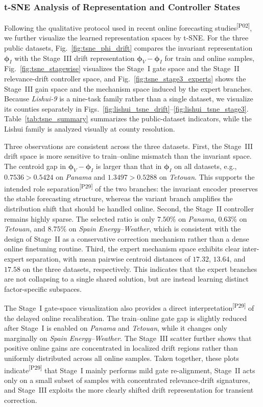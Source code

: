 ﻿\documentclass[journal]{IEEEtran}
\DeclareRobustCommand{\auditbad}[2]{{\color{auditred}#1}{\color{auditred}\textsuperscript{[#2]}}}
\begin{document}
\subsubsection{t-SNE Analysis of Representation and Controller States}
\auditbad{Following the qualitative protocol used in recent online forecasting studies}{P02}, we further visualize the learned representation spaces by t-SNE. For the three public datasets, Fig.~\ref{fig:tsne_phi_drift} compares the invariant representation $\boldsymbol{\phi}_{I}$ with the Stage~III drift representation $\boldsymbol{\phi}_{V}-\boldsymbol{\phi}_{I}$ for train and online samples, Fig.~\ref{fig:tsne_stagewise} visualizes the Stage~I gate space and the Stage~II relevance-drift controller space, and Fig.~\ref{fig:tsne_stage3_experts} shows the Stage~III gain space and the mechanism space induced by the expert branches. Because \textit{Lishui-9} is a nine-task family rather than a single dataset, we visualize its counties separately in Figs.~\ref{fig:lishui_tsne_drift}--\ref{fig:lishui_tsne_stage3}. Table~\ref{tab:tsne_summary} summarizes the public-dataset indicators, while the Lishui family is analyzed visually at county resolution.

Three observations are consistent across the three datasets. First, the Stage~III drift space is more sensitive to train--online mismatch than the invariant space. The centroid gap in $\boldsymbol{\phi}_{V}-\boldsymbol{\phi}_{I}$ is larger than that in $\boldsymbol{\phi}_{I}$ on all datasets, e.g., $0.7536>0.5424$ on \textit{Panama} and $1.3497>0.5288$ on \textit{Tetouan}. This \auditbad{supports the intended role separation}{P29} of the two branches: the invariant encoder preserves the stable forecasting structure, whereas the variant branch amplifies the distribution shift that should be handled online. Second, the Stage~II controller remains highly sparse. The selected ratio is only $7.50\%$ on \textit{Panama}, $0.63\%$ on \textit{Tetouan}, and $8.75\%$ on \textit{Spain Energy--Weather}, which is consistent with the design of Stage~II as a conservative correction mechanism rather than a dense online finetuning routine. Third, the expert mechanism space exhibits clear inter-expert separation, with mean pairwise centroid distances of $17.32$, $13.64$, and $17.58$ on the three datasets, respectively. This indicates that the expert branches are not collapsing to a single shared solution, but are instead learning distinct factor-specific subspaces.

The Stage~I gate-space visualization also provides a \auditbad{direct interpretation}{P29} of the delayed online recalibration. The train--online gate gap is slightly reduced after Stage~I is enabled on \textit{Panama} and \textit{Tetouan}, while it changes only marginally on \textit{Spain Energy--Weather}. The Stage~III scatter further shows that positive online gains are concentrated in localized drift regions rather than uniformly distributed across all online samples. Taken together, these plots \auditbad{indicate}{P29} that Stage~I mainly performs mild gate re-alignment, Stage~II acts only on a small subset of samples with concentrated relevance-drift signatures, and Stage~III exploits the more clearly shifted drift representation for transient correction.
\end{document}

